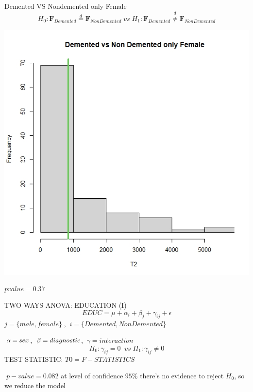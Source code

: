 \documentclass{beamer}
\begin{document}
	\begin{frame}{Demented VS Nondemented only Female}
	\vspace{-0.4cm}
	$$
	H_0: \mathbf{F}_{Demented} \overset{d}{=} \mathbf{F}_{Non Demented}\;vs\;H_1:\mathbf{F}_{Demented} \overset{d}{\neq} \mathbf{F}_{Non Demented}
	$$
	\begin{center}
		\includegraphics[width=0.5\columnwidth]{dvsnfemale.jpeg}
	\end{center}
	\vspace{-0.7cm}
	$pvalue= 0.37 $
		
	\end{frame}
	
	
	\begin{frame}{ TWO WAYS ANOVA: EDUCATION (I)}
	\vspace{-0.3cm}
 	$$ EDUC =   \mu + \alpha_i + \beta_j + \gamma_{ij} + \epsilon  $$
 	$ j =\{male,female\} \;$,
 	$\: i=\{ Demented, Non Demented \}$
 	
 	
 	$\: \alpha= sex \space$, 
	$\: \beta= diagnostic \space$, 
	$\: \gamma= interaction$
	$$
	H_0: \gamma_{ij}=0\; \;vs\;H_1:\gamma_{ij}\neq0 
	$$
	TEST STATISTIC: $ T0= F-STATISTICS \; $
	
	$\; p-value = 0.082 $
	at level of confidence $ 95\% $ there's no evidence to	reject $H_0$, 
	so we reduce the model
	\vspace{-0.2cm}
	
	
\end{frame}
	
\end{document}
